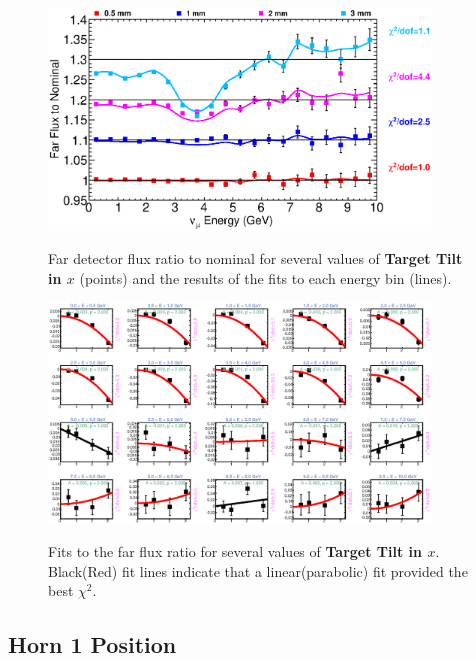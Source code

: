 \begin{figure}[ht]
  \begin{center}
    {\includegraphics[width=4.0in]{figures/TargetXTilt_far_summary.eps}}
  \end{center}
\caption{ Far detector flux ratio to nominal for several values of {\bf Target Tilt in $x$} (points) and the results of the fits to each energy bin (lines).}
\end{figure}

\begin{figure}[hb]
  \begin{center}
    {\includegraphics[width=4.0in]{figures/TargetXTilt_far_fits.eps}}
  \end{center}
\caption{ Fits to the far flux ratio for several values of {\bf Target Tilt in $x$}. Black(Red) fit lines indicate that a linear(parabolic) fit provided the best $\chi^2$. }
\end{figure}

\clearpage
\subsection{Horn 1 Position}

